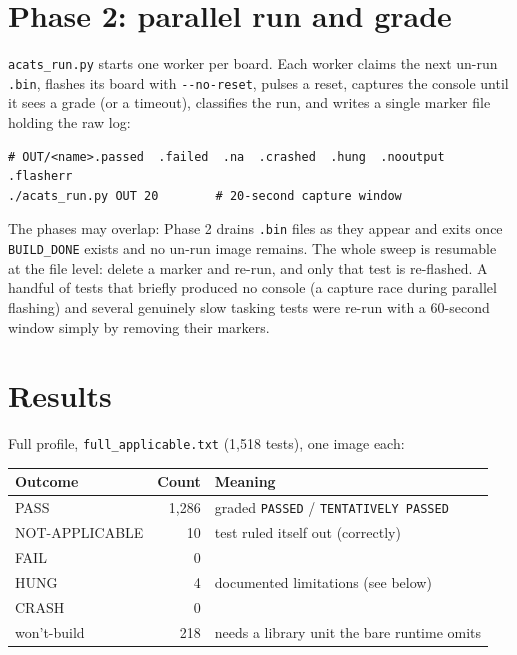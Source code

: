 \section{Phase 2: parallel run and grade}

\texttt{acats\_run.py} starts one worker per board. Each worker claims the next
un-run \texttt{.bin}, flashes its board with \texttt{-{}-no-reset}, pulses a reset,
captures the console until it sees a grade (or a timeout), classifies the run, and
writes a single marker file holding the raw log:

\begin{lstlisting}[style=sh]
# OUT/<name>.passed  .failed  .na  .crashed  .hung  .nooutput  .flasherr
./acats_run.py OUT 20        # 20-second capture window
\end{lstlisting}

The phases may overlap: Phase 2 drains \texttt{.bin} files as they appear and exits
once \texttt{BUILD\_DONE} exists and no un-run image remains. The whole sweep is
resumable at the file level: delete a marker and re-run, and only that test is
re-flashed. A handful of tests that briefly produced no console (a capture race during
parallel flashing) and several genuinely slow tasking tests were re-run with a 60-second
window simply by removing their markers.

\section{Results}

Full profile, \texttt{full\_applicable.txt} (1{,}518 tests), one image each:

\begin{longtable}{p{4.5cm} r p{6.5cm}}
\toprule
\textbf{Outcome} & \textbf{Count} & \textbf{Meaning} \\ \midrule
\endhead
PASS                & 1{,}286 & graded \texttt{PASSED} / \texttt{TENTATIVELY PASSED} \\
NOT-APPLICABLE      & 10      & test ruled itself out (correctly) \\
FAIL                & 0       & \\
HUNG                & 4       & documented limitations (see below) \\
CRASH               & 0       & \\
won't-build         & 218     & needs a library unit the bare runtime omits \\
\bottomrule
\end{longtable}

